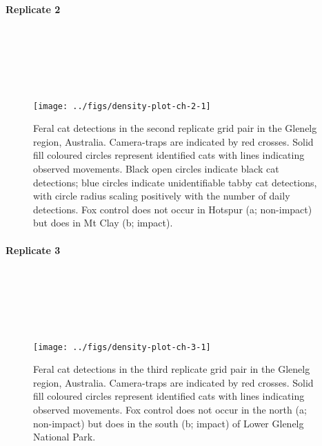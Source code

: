 \documentclass[preprint, 3p, authoryear]{elsarticle} %
\begin{document}
\newpage

\hypertarget{replicate-2}{%
\paragraph*{Replicate 2}\label{replicate-2}}

\(~\)

\(~\)

\(~\)

\begin{figure}

{\centering \texttt{[image: ../figs/density-plot-ch-2-1]} 

}

\caption{Feral cat detections in the second replicate grid pair in the Glenelg region, Australia. Camera-traps are indicated by red crosses. Solid fill coloured circles represent identified cats with lines indicating observed movements. Black open circles indicate black cat detections; blue circles indicate unidentifiable tabby cat detections, with circle radius scaling positively with the number of daily detections. Fox control does not occur in Hotspur (a; non-impact) but does in Mt Clay (b; impact).}\label{fig:density-plot-ch-2}
\end{figure}

\newpage

\hypertarget{replicate-3}{%
\paragraph*{Replicate 3}\label{replicate-3}}

\(~\)

\(~\)

\(~\)

\begin{figure}

{\centering \texttt{[image: ../figs/density-plot-ch-3-1]} 

}

\caption{Feral cat detections in the third replicate grid pair in the Glenelg region, Australia. Camera-traps are indicated by red crosses. Solid fill coloured circles represent identified cats with lines indicating observed movements. Fox control does not occur in the north (a; non-impact) but does in the south (b; impact) of Lower Glenelg National Park.}\label{fig:density-plot-ch-3}
\end{figure}
\end{document}
